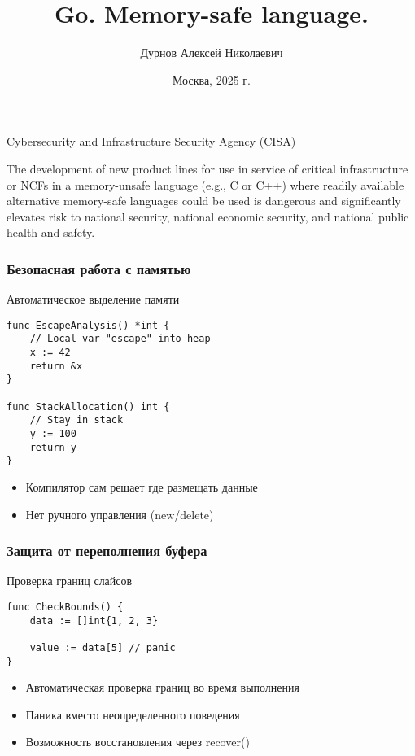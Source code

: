 \documentclass[10pt]{beamer}
\title[]{Go. Memory-safe language.}
\author{Дурнов Алексей Николаевич}
\institute[МФТИ]{
    Московский физико-технический институт\\
    Физтех-школа радиотехники и компьютерных технологий\\
}
\date{Москва, 2025 г.}
\begin{document}
\begin{frame}
    \titlepage
    \thispagestyle{empty}
\end{frame}

\begin{frame}{Cybersecurity and Infrastructure Security Agency (CISA)}
    \begin{block}{}
        The development of new product lines for use in service of critical infrastructure or NCFs in a memory-unsafe language (e.g., C or C++)
        where readily available alternative memory-safe languages could be used is dangerous and significantly elevates risk to national security,
        national economic security, and national public health and safety.
    \end{block}
\end{frame}

\begin{frame}[fragile]
    \frametitle{Безопасная работа с памятью}
    \begin{block}{Автоматическое выделение памяти}
    \begin{lstlisting}[style=gostyle, language=Golang]
func EscapeAnalysis() *int {
    // Local var "escape" into heap
    x := 42
    return &x
}

func StackAllocation() int {
    // Stay in stack
    y := 100
    return y
}
    \end{lstlisting}
    \end{block}
    \begin{itemize}
        \item Компилятор сам решает где размещать данные
        \item Нет ручного управления (new/delete)
    \end{itemize}
    \end{frame}

\begin{frame}[fragile]{}
    \frametitle{Защита от переполнения буфера}
    \begin{block}{Проверка границ слайсов}
    \begin{lstlisting}[style=gostyle, language=Golang]
func CheckBounds() {
    data := []int{1, 2, 3}

    value := data[5] // panic
}
    \end{lstlisting}
    \end{block}
    \begin{itemize}
        \item Автоматическая проверка границ во время выполнения
        \item Паника вместо неопределенного поведения
        \item Возможность восстановления через recover()
    \end{itemize}
\end{frame}
\end{document}
